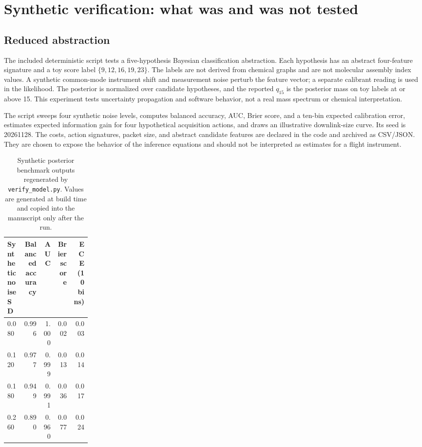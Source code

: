 \documentclass[10pt,a4paper]{article}
\begin{document}
\section{Synthetic verification: what was and was not tested}
\subsection{Reduced abstraction}
The included deterministic script tests a five-hypothesis Bayesian classification abstraction. Each hypothesis has an abstract four-feature signature and a toy score label $\{9,12,16,19,23\}$. The labels are not derived from chemical graphs and are not molecular assembly index values. A synthetic common-mode instrument shift and measurement noise perturb the feature vector; a separate calibrant reading is used in the likelihood. The posterior is normalized over candidate hypotheses, and the reported $q_{15}$ is the posterior mass on toy labels at or above 15. This experiment tests uncertainty propagation and software behavior, not a real mass spectrum or chemical interpretation.

The script sweeps four synthetic noise levels, computes balanced accuracy, AUC, Brier score, and a ten-bin expected calibration error, estimates expected information gain for four hypothetical acquisition actions, and draws an illustrative downlink-size curve. Its seed is 20261128. The costs, action signatures, packet size, and abstract candidate features are declared in the code and archived as CSV/JSON. They are chosen to expose the behavior of the inference equations and should not be interpreted as estimates for a flight instrument.

\begin{table}[H]
\centering\small
\caption{Synthetic posterior benchmark outputs regenerated by \texttt{verify\_model.py}. Values are generated at build time and copied into the manuscript only after the run.}
\label{tab:synthetic}
\begin{tabularx}{\linewidth}{p{0.20\linewidth}rrrr}
\toprule
Synthetic noise SD & Balanced accuracy & AUC & Brier score & ECE (10 bins) \\
\midrule
0.080 & 0.996 & 1.000 & 0.002 & 0.003 \\
0.120 & 0.977 & 0.999 & 0.013 & 0.014 \\
0.180 & 0.949 & 0.991 & 0.036 & 0.017 \\
0.260 & 0.890 & 0.960 & 0.077 & 0.024 \\
\bottomrule
\end{tabularx}
\end{table}
\end{document}
